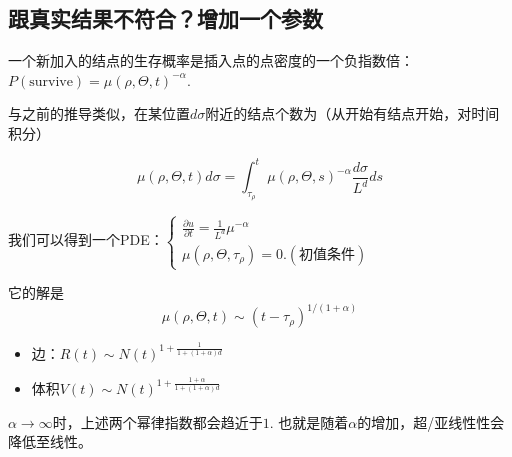 \subsection{跟真实结果不符合？增加一个参数}

一个新加入的结点的生存概率是插入点的点密度的一个负指数倍：\(P(\text{survive})=\mu(\rho,\Theta,t)^{-\alpha}\).

与之前的推导类似，在某位置\(d\sigma\)附近的结点个数为（从开始有结点开始，对时间积分）

\[\mu(\rho,\Theta,t)d\sigma = \int_{\tau_\rho}^t \mu(\rho,\Theta,s)^{-\alpha} \frac{d\sigma}{L^d}ds\]

我们可以得到一个PDE：$\begin{cases}
\frac{\partial u}{\partial t} =\frac{1}{L^d}\mu^{-\alpha}\\
\mu(\rho,\Theta,\tau_\rho)=0. (\text{初值条件})
\end{cases}$

它的解是\[\mu(\rho,\Theta,t)\sim{(t-\tau_\rho)}^{1/(1+\alpha)}\]
\begin{itemize}
\item
  边：\(R(t)\sim N(t)^{1+\frac{1}{1+(1+\alpha)d}}\)
\item
  体积\(V(t)\sim N(t)^{1+\frac{1+\alpha}{1+(1+\alpha)d}}\)
\end{itemize}
\(\alpha\rightarrow\infty\)时，上述两个幂律指数都会趋近于\(1\).
也就是随着\(\alpha\)的增加，超/亚线性性会降低至线性。